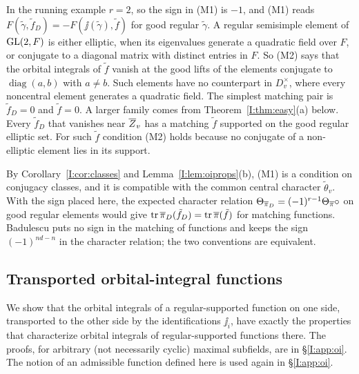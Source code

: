 \begin{example}[Continuing Example~\ref{ex:running}: matching when $r=2$]\label{I:ex:matching}
In the running example $r=2$, so the sign in (M1) is $-1$, and (M1) reads $F(\tilde\gamma,\tilde f_D)=-F(\jj(\tilde\gamma),\tilde f)$ for good regular $\tilde\gamma$. A regular semisimple element of $\mathrm{GL}(2,F)$ is either elliptic, when its eigenvalues generate a quadratic field over $F$, or conjugate to a diagonal matrix with distinct entries in $F$. So (M2) says that the orbital integrals of $\tilde f$ vanish at the good lifts of the elements conjugate to $\operatorname{diag}(a,b)$ with $a\neq b$. Such elements have no counterpart in $D_v^\times$, where every noncentral element generates a quadratic field. The simplest matching pair is $\tilde f_D=0$ and $\tilde f=0$. A larger family comes from Theorem~\ref{I:thm:easy}(a) below. Every $\tilde f_D$ that vanishes near $\overline{Z}_v$ has a matching $\tilde f$ supported on the good regular elliptic set. For such $\tilde f$ condition (M2) holds because no conjugate of a non-elliptic element lies in its support.
\end{example}


By Corollary~\ref{I:cor:classes} and Lemma~\ref{I:lem:oiprops}(b), (M1) is a condition on conjugacy classes, and it is compatible with the common central character $\tilde\theta_v$. With the sign placed here, the expected character relation $\Theta_{\overline{\pi}_D}=(-1)^{r-1}\Theta_{\overline{\pi}}\circ\relax$ on good regular elements would give $\operatorname{tr}\overline{\pi}_D(\tilde f_D)=\operatorname{tr}\overline{\pi}(\tilde f)$ for matching functions. Badulescu \cite[\S4.6]{Bad08} puts no sign in the matching of functions and keeps the sign $(-1)^{nd-n}$ in the character relation; the two conventions are equivalent.

\subsection{Transported orbital-integral functions}\label{I:subsec:transported}
We show that the orbital integrals of a regular-supported function on one side, transported to the other side by the identifications $\jj_i$, have exactly the properties that characterize orbital integrals of regular-supported functions there. The proofs, for arbitrary (not necessarily cyclic) maximal subfields, are in \S\ref{I:app:oi}. The notion of an admissible function defined here is used again in \S\ref{I:app:oi}.

